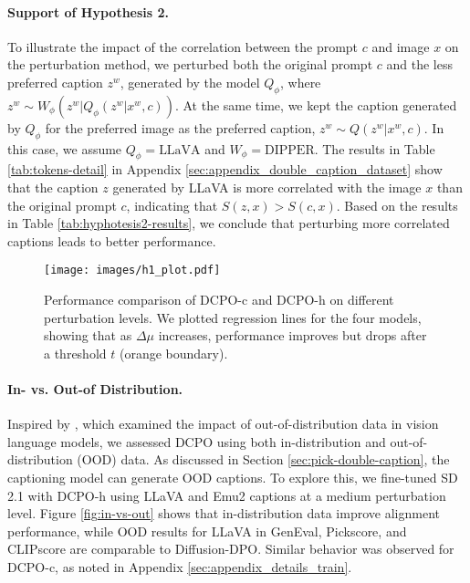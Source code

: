 

\paragraph{Support of Hypothesis 2.} To illustrate the impact of the correlation between the prompt \( c \) and image \( x \) on the perturbation method, we perturbed both the original prompt \( c \) and the less preferred caption \( z^w \), generated by the model \( Q_{\phi} \), where \( z^w \sim W_{\phi}(z^w | Q_{\phi}(z^w | x^w, c)) \). At the same time, we kept the caption generated by \( Q_{\phi} \) for the preferred image as the preferred caption, \( z^w \sim Q(z^w | x^w, c) \). In this case, we assume \(Q_{\phi} = \text{LLaVA}\) and \(W_{\phi} = \text{DIPPER}\). The results in Table \ref{tab:tokens-detail} in Appendix \ref{sec:appendix_double_caption_dataset} show that the caption \( z \) generated by LLaVA is more correlated with the image \( x \) than the original prompt \( c \), indicating that \( S(z,x) > S(c,x) \). Based on the results in Table \ref{tab:hyphotesis2-results}, we conclude that perturbing more correlated captions leads to better performance.

\begin{figure}[t]
    \centering
    
    \texttt{[image: images/h1\_plot.pdf]}
    \vspace{-2em}
    \caption{Performance comparison of DCPO-c and DCPO-h on different perturbation levels. We plotted regression lines for the four models, showing that as \( \Delta \mu \) increases, performance improves but drops after a threshold \( t \) (orange boundary).}
    \label{fig:hyphotesis1}
\end{figure}






\paragraph{In- vs. Out-of Distribution.} Inspired by 
\citep{Verma_2024_CVPR}, which examined the impact of out-of-distribution data in vision language models, we assessed DCPO using both in-distribution and out-of-distribution (OOD) data. As discussed in Section \ref{sec:pick-double-caption}, the captioning model can generate OOD captions. To explore this, we fine-tuned SD 2.1 with DCPO-h using LLaVA and Emu2 captions at a medium perturbation level. Figure \ref{fig:in-vs-out} shows that in-distribution data improve alignment performance, while OOD results for LLaVA in GenEval, Pickscore, and CLIPscore are comparable to Diffusion-DPO. Similar behavior was observed for DCPO-c, as noted in Appendix \ref{sec:appendix_details_train}.


